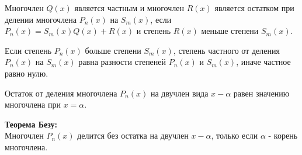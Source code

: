 \documentclass[oneside]{book}
\begin{document}
	Многочлен
	\begin{math}
		Q(x)
	\end{math}
	является частным и многочлен
	\begin{math}
		R(x)
	\end{math}
	является остатком при делении многочлена
	\begin{math}
		P_n(x)
	\end{math}
	на
	\begin{math}
		S_m(x)
	\end{math},
	если
	\begin{math}
		P_n(x) = S_m(x)Q(x) + R(x)
	\end{math}
	и степень
	\begin{math}
		R(x)
	\end{math}
	меньше степени
	\begin{math}
		S_m(x)
	\end{math}.

	Если
	степень
	\begin{math}
		P_n(x)
	\end{math}
	больше степени
	\begin{math}
		S_m(x)
	\end{math},
	степень частного от деления
	\begin{math}
		P_n(x)
	\end{math}
	на
	\begin{math}
		S_m(x)
	\end{math}
	равна разности степеней
	\begin{math}
		P_n(x)
	\end{math}
	и
	\begin{math}
		S_m(x)
	\end{math},
	иначе частное равно нулю.

	Остаток от деления многочлена
	\begin{math}
		P_n(x)
	\end{math}
	на двучлен вида
	\begin{math}
		x - \alpha
	\end{math}
	равен значению многочлена при
	\begin{math}
		x = \alpha
	\end{math}.

	\textbf{Теорема Безу:}
	\\
	Многочлен
	\begin{math}
		P_n(x)
	\end{math}
	делится без остатка на двучлен
	\begin{math}
		x - \alpha
	\end{math},
	только если
	\begin{math}
		\alpha
	\end{math}
	- корень многочлена.
\end{document}
